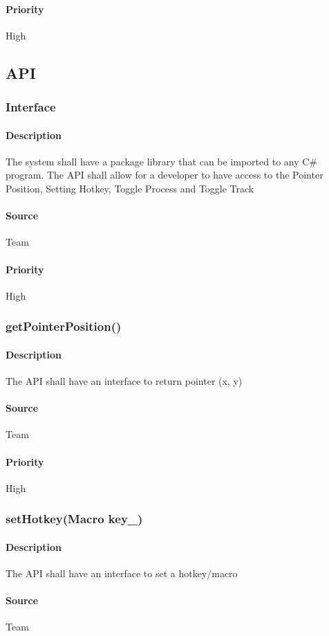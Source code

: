 \paragraph{Priority}
High
\subsection{API}
\subsubsection{Interface}
\paragraph{Description}
The system shall have a package library that can be imported to any C\# program. The API shall allow for a developer to have access to the Pointer Position, Setting Hotkey, Toggle Process and Toggle Track
\paragraph{Source}
Team
\paragraph{Priority}
High
\subsubsection{getPointerPosition()}
\paragraph{Description}
The API shall have an interface to return pointer (x, y)
\paragraph{Source}
Team
\paragraph{Priority}
High
\subsubsection{setHotkey(Macro key\_)}
\paragraph{Description}
The API shall have an interface to set a hotkey/macro
\paragraph{Source}
Team
